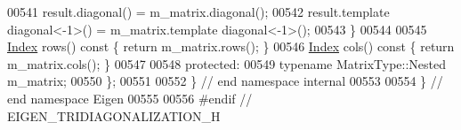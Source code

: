 \begin{DoxyCode}
00541       result.diagonal() = m\_matrix.diagonal();
00542       result.template diagonal<-1>() = m\_matrix.template diagonal<-1>();
00543     \}
00544 
00545     \hyperlink{namespace_eigen_a62e77e0933482dafde8fe197d9a2cfde}{Index} rows()\textcolor{keyword}{ const }\{ \textcolor{keywordflow}{return} m\_matrix.rows(); \}
00546     \hyperlink{namespace_eigen_a62e77e0933482dafde8fe197d9a2cfde}{Index} cols()\textcolor{keyword}{ const }\{ \textcolor{keywordflow}{return} m\_matrix.cols(); \}
00547 
00548   \textcolor{keyword}{protected}:
00549     \textcolor{keyword}{typename} MatrixType::Nested m\_matrix;
00550 \};
00551 
00552 \} \textcolor{comment}{// end namespace internal}
00553 
00554 \} \textcolor{comment}{// end namespace Eigen}
00555 
00556 \textcolor{preprocessor}{#endif // EIGEN\_TRIDIAGONALIZATION\_H}
\end{DoxyCode}
